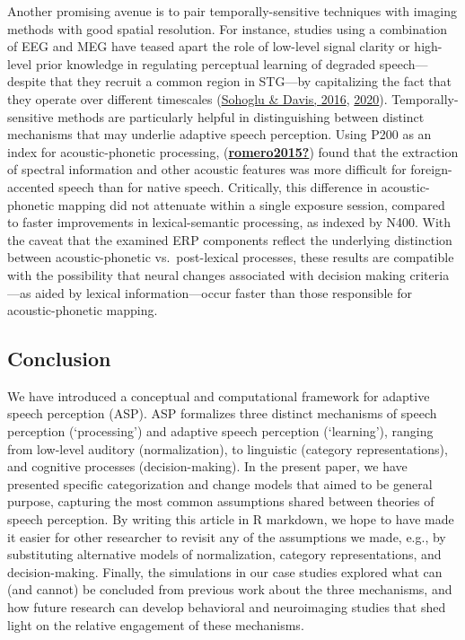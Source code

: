 \documentclass[
  11pt,
  english,
  man,floatsintext]{apa6}
\begin{document}
Another promising avenue is to pair temporally-sensitive techniques with imaging methods with good spatial resolution. For instance, studies using a combination of EEG and MEG have teased apart the role of low-level signal clarity or high-level prior knowledge in regulating perceptual learning of degraded speech---despite that they recruit a common region in STG---by capitalizing the fact that they operate over different timescales (\protect\hyperlink{ref-sohoglu-davis2016}{Sohoglu \& Davis, 2016}, \protect\hyperlink{ref-sohoglu-davis2020}{2020}). Temporally-sensitive methods are particularly helpful in distinguishing between distinct mechanisms that may underlie adaptive speech perception. Using P200 as an index for acoustic-phonetic processing, (\protect\hyperlink{ref-romero2015}{\textbf{romero2015?}}) found that the extraction of spectral information and other acoustic features was more difficult for foreign-accented speech than for native speech. Critically, this difference in acoustic-phonetic mapping did not attenuate within a single exposure session, compared to faster improvements in lexical-semantic processing, as indexed by N400. With the caveat that the examined ERP components reflect the underlying distinction between acoustic-phonetic vs.~post-lexical processes, these results are compatible with the possibility that neural changes associated with decision making criteria---as aided by lexical information---occur faster than those responsible for acoustic-phonetic mapping.

\hypertarget{conclusion}{%
\subsection{Conclusion}\label{conclusion}}

We have introduced a conceptual and computational framework for adaptive speech perception (ASP). ASP formalizes three distinct mechanisms of speech perception (`processing') and adaptive speech perception (`learning'), ranging from low-level auditory (normalization), to linguistic (category representations), and cognitive processes (decision-making). In the present paper, we have presented specific categorization and change models that aimed to be general purpose, capturing the most common assumptions shared between theories of speech perception. By writing this article in R markdown, we hope to have made it easier for other researcher to revisit any of the assumptions we made, e.g., by substituting alternative models of normalization, category representations, and decision-making. Finally, the simulations in our case studies explored what can (and cannot) be concluded from previous work about the three mechanisms, and how future research can develop behavioral and neuroimaging studies that shed light on the relative engagement of these mechanisms.
\end{document}

